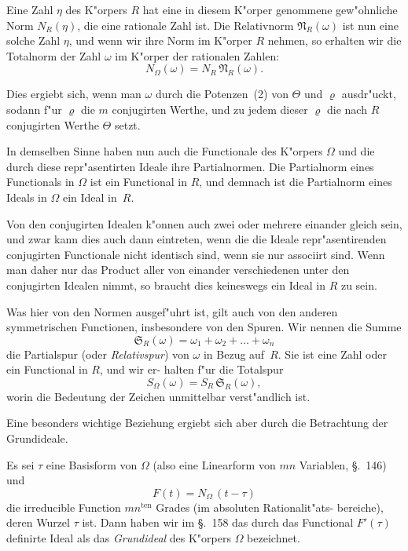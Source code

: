 \documentclass[12pt,a4paper]{article}
\theoremstyle{weber}
\begin{document}
Eine Zahl $\eta$ des K"orpers $R$ hat eine in diesem K"orper
genommene gew"ohnliche Norm $N_R(\eta)$, die eine rationale Zahl
ist. Die Relativnorm $\mathfrak{N}_R(\omega)$ ist nun eine solche Zahl $\eta$, und
wenn wir ihre Norm im K"orper $R$ nehmen, so erhalten wir die
Totalnorm der Zahl $\omega$ im K"orper der rationalen Zahlen:
\begin{equation}\label{eq:s159-5}
N_\varOmega(\omega) = N_R\,\mathfrak{N}_R(\omega).
\end{equation}

Dies ergiebt sich, wenn man $\omega$ durch die Potenzen~(2) von
$\varTheta$ und $\varrho$ ausdr"uckt, sodann f"ur $\varrho$ die $m$ conjugirten Werthe,
und zu jedem dieser $\varrho$ die nach $R$ conjugirten Werthe $\varTheta$ setzt.

In demselben Sinne haben nun auch die Functionale des
K"orpers $\varOmega$ und die durch diese repr"asentirten Ideale ihre
Partialnormen. Die Partialnorm eines Functionals in $\varOmega$ ist
ein Functional in $R$, und demnach ist die Partialnorm eines
Ideals in $\varOmega$ ein Ideal in~$R$.

Von den conjugirten Idealen k"onnen auch zwei oder mehrere
einander gleich sein, und zwar kann dies auch dann eintreten,
wenn die die Ideale repr"asentirenden conjugirten Functionale
nicht identisch sind, wenn sie nur associirt sind. Wenn man
daher nur das Product aller von einander verschiedenen unter
den conjugirten Idealen nimmt, so braucht dies keineswegs ein
Ideal in $R$ zu sein.

Was hier von den Normen ausgef"uhrt ist, gilt auch von
den anderen symmetrischen Functionen, insbesondere von den
Spuren. Wir nennen die Summe
\begin{equation}\label{eq:s159-6}
\mathfrak{S}_R(\omega) = \omega_1 + \omega_2 + \dots + \omega_n
\end{equation}
die Partialspur (oder \emph{Relativspur}) von $\omega$ in Bezug
auf~$R$. Sie ist eine Zahl oder ein Functional in $R$, und wir er-
halten f"ur die Totalspur
\begin{equation}\label{eq:s159-7}
S_\varOmega(\omega) = S_R\,\mathfrak{S}_R(\omega),
\end{equation}
worin die Bedeutung der Zeichen unmittelbar verst"andlich ist.

Eine besonders wichtige Beziehung ergiebt sich aber durch
die Betrachtung der Grundideale.

Es sei $\tau$ eine Basisform von $\varOmega$ (also eine Linearform von
$mn$ Variablen, \S.~146) und
\[
F(t) = N_\varOmega\,(t-\tau)
\]
die irreducible Function $mn^{\mathrm{ten}}$ Grades (im absoluten Rationalit"ats-
bereiche), deren Wurzel $\tau$ ist. Dann haben wir im \S.~158 das
durch das Functional $F'(\tau)$ definirte Ideal als das \emph{Grundideal}
des K"orpers $\varOmega$ bezeichnet.
\end{document}
